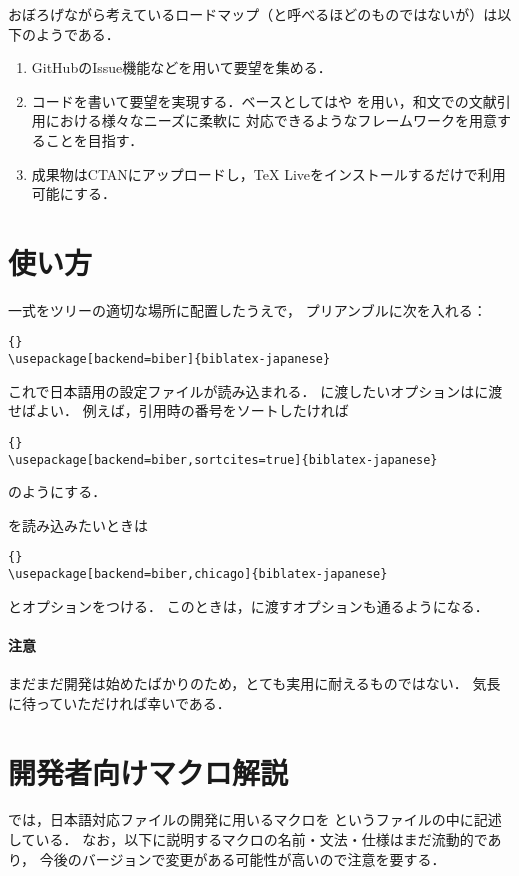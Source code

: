 \documentclass[lualatex,ja=standard,magstyle=real]{bxjsarticle}
\begin{document}
おぼろげながら考えているロードマップ（と呼べるほどのものではないが）は以下のようである．
\begin{enumerate}
\item GitHubのIssue機能などを用いて要望を集める．
\item コードを書いて要望を実現する．ベースとしてはや
  を用い，和文での文献引用における様々なニーズに柔軟に
  対応できるようなフレームワークを用意することを目指す．
\item 成果物はCTANにアップロードし，\TeX{} Liveをインストールするだけで利用可能にする．
\end{enumerate}

\section{使い方}
一式をツリーの適切な場所に配置したうえで，
プリアンブルに次を入れる：
\begin{lstlisting}[style=latex]{}
\usepackage[backend=biber]{biblatex-japanese}
\end{lstlisting}
これで日本語用の設定ファイルが読み込まれる．
に渡したいオプションはに渡せばよい．
例えば，引用時の番号をソートしたければ
\begin{lstlisting}[style=latex]{}
\usepackage[backend=biber,sortcites=true]{biblatex-japanese}
\end{lstlisting}
のようにする．

を読み込みたいときは
\begin{lstlisting}[style=latex]{}
\usepackage[backend=biber,chicago]{biblatex-japanese}
\end{lstlisting}
とオプションをつける．
このときは，に渡すオプションも通るようになる．

\paragraph{注意}
まだまだ開発は始めたばかりのため，とても実用に耐えるものではない．
気長に待っていただければ幸いである．

\section{開発者向けマクロ解説}
では，日本語対応ファイルの開発に用いるマクロを
というファイルの中に記述している．
なお，以下に説明するマクロの名前・文法・仕様はまだ流動的であり，
今後のバージョンで変更がある可能性が高いので注意を要する．
\end{document}
